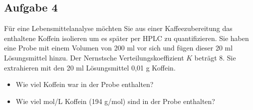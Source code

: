 \documentclass[a4paper,10pt]{article}
\newif\ifshowme
\begin{document}
\begin{multicols}{2}
\subsection*{Aufgabe 4}
Für eine Lebensmittelanalyse möchten Sie aus einer Kaffeezubereitung das enthaltene Koffein isolieren um es später per HPLC zu quantifizieren. Sie haben eine Probe mit einem Volumen von 200 ml vor sich und fügen dieser 20 ml Lösungsmittel hinzu. Der Nernstsche Verteilungskoeffizient $K$ beträgt 8. Sie extrahieren mit den 20 ml Lösungsmittel 0,01 g Koffein. \pp
\begin{itemize}
\item Wie viel Koffein war in der Probe enthalten? 
\item Wie viel mol/L Koffein (194 g/mol) sind in der Probe enthalten?
\end{itemize}
\ifshowme
\antwort{
\begin{align*}
8 &= \frac{0,01~\text{g/20 ml}}{x ~\text{g/ 200 ml}} \\
x ~\text{g} &= \frac{0,0005 ~\text{g/ml}}{8} \cdot 200 ~\text{ml} \\
&= 0,0000625 ~\text{g/ml} \cdot 200~\text{ml} \\
&= 0,0125 ~\text{g}
\end{align*}
Gesamtmenge
\begin{align*}
0,0125 ~\text{g} + 0,01 ~\text{g}
\end{align*}
Insgesamt waren also 0,0225 g Koffein enthalten.
\pp
Mol berechnen:
\begin{align*}
\frac{0,0225 ~\text{g} / 200 ~\text{ml}}{194~\text{g/mol}} \cdot 1.000 = 5,8 \cdot 10^{-4} ~\text{mol/L}
\end{align*}
}
\else
\fi

\end{multicols}
\end{document}
